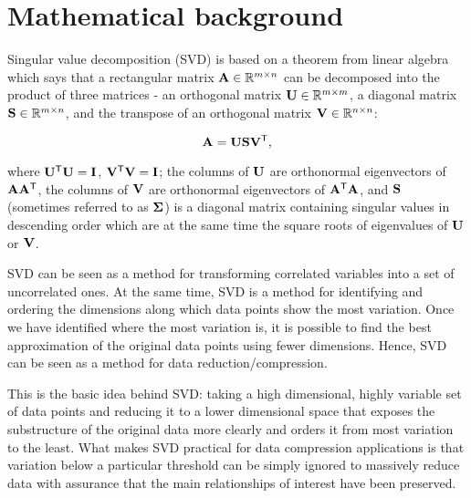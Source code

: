 \section{Mathematical background}
\label{sec:math}


Singular value decomposition (SVD) \cite{Baker2013, Kalman2002} is based on a theorem from linear algebra which says that a rectangular matrix $\mathbf{A} \in \mathbb{R}^{m \times n}$ can be decomposed into the product of three matrices - an orthogonal matrix $\mathbf{U} \in \mathbb{R}^{m \times m}$, a diagonal
matrix $\mathbf{S} \in \mathbb{R}^{m \times n}$, and the transpose of an orthogonal matrix $\mathbf{V} \in \mathbb{R}^{n \times n}$:

\begin{equation}
\mathbf{A} = \mathbf{U} \mathbf{S} \mathbf{V}^\mathsf{T},
\label{eq:svd-def}
\end{equation}

\noindent
where $\mathbf{U^\mathsf{T}U} = \mathbf{I}$, $\mathbf{V^\mathsf{T}V} = \mathbf{I}$; the columns of $\mathbf{U}$ are orthonormal eigenvectors of $\mathbf{AA^\mathsf{T}}$, the columns of $\mathbf{V}$ are orthonormal eigenvectors of $\mathbf{A^\mathsf{T}A}$, and $\mathbf{S}$ (sometimes referred to as $\mathbf{\Sigma}$) is a diagonal matrix containing singular values in descending order which are at the same time the square roots of eigenvalues of $\mathbf{U}$ or $\mathbf{V}$.

SVD can be seen as a method for transforming correlated variables into a set of uncorrelated ones. At the same time, SVD is a method for identifying and ordering the dimensions along which data points show the most variation. Once we have identified where the most variation is, it is possible to find the best approximation of the original data points using fewer dimensions. Hence, SVD can be seen as a method for data reduction/compression.

This is the basic idea behind SVD: taking a high dimensional, highly variable set of data points and reducing it to a lower dimensional space that exposes the substructure of the original data more clearly and orders it from most variation to the least. What makes SVD practical for data compression applications is that variation below a particular threshold can be simply ignored to massively reduce data with assurance that the main relationships of interest have been preserved.


